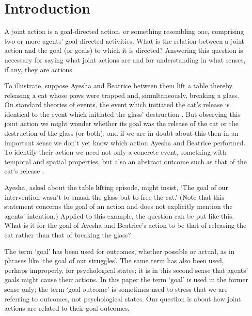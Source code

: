 \documentclass[12pt,a4paper]{extarticle}
\begin{document}
\section{Introduction}
A joint action is a goal-directed action, or something resembling one, comprising two or more agents' goal-directed activities.  What is the relation between a joint action and the goal (or goals) to which it is directed?  
Answering this question is necessary for saying what joint actions are and for understanding in what senses, if any, they are actions.


To illustrate, suppose Ayesha and Beatrice between them lift a table thereby releasing a cat whose paws were trapped and,  simultaneously, breaking a glass.  On standard theories of events, the event which initiated the cat's release is identical to the event which initiated the glass' destruction \citep{Davidson:1969ie}.  But observing this joint action we might wonder whether its goal was the release of the cat or the destruction of the glass (or both); and if we are in doubt about this then in an important sense we don't yet know which action Ayesha and Beatrice performed.  To identify their action we need not only a concrete event, something with temporal and spatial properties, but also an abstract outcome such as that of the cat's release \citep{Davidson:1971fz}.

Ayesha, asked about the table lifting episode, might insist, `The goal of our intervention wasn't to smash the glass but to free the cat.'  (Note that this statement concerns the goal of an action and does not explicitly mention the agents' intention.)  Applied to this example, the question can be put like this.  What is it for the goal of Ayesha and Beatrice's action to be that of releasing the cat rather than that of breaking the glass?

The term `goal' has been used for outcomes, whether possible or actual, as in phrases like `the goal of our struggles'.  The same term has also been used, perhaps improperly, for psychological states; it is in this second sense that agents' goals might cause their actions.  In this paper the term `goal' is used in the former sense only; the term `goal-outcome' is sometimes used to stress that we are referring to outcomes, not psychological states.  Our question is about how joint actions are related to their goal-outcomes.  
\end{document}
